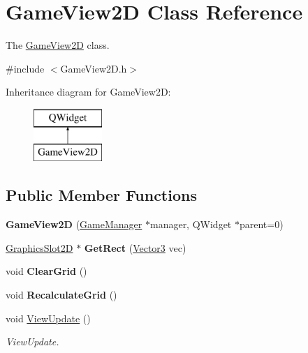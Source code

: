 \hypertarget{classGameView2D}{\section{Game\-View2\-D Class Reference}
\label{classGameView2D}
}


The \hyperlink{classGameView2D}{Game\-View2\-D} class.  




{\ttfamily \#include $<$Game\-View2\-D.\-h$>$}

Inheritance diagram for Game\-View2\-D\-:\begin{figure}[H]
\begin{center}
\leavevmode
\includegraphics[height=2.000000cm]{classGameView2D}
\end{center}
\end{figure}
\subsection*{Public Member Functions}
\begin{DoxyCompactItemize}
\item 
\hypertarget{classGameView2D_ade0d3e85d2385f952db7a5a72dcc34e3}{{\bfseries Game\-View2\-D} (\hyperlink{classGameManager}{Game\-Manager} $\ast$manager, Q\-Widget $\ast$parent=0)}\label{classGameView2D_ade0d3e85d2385f952db7a5a72dcc34e3}

\item 
\hypertarget{classGameView2D_a2599584223096c30f37ed12566ccea32}{\hyperlink{classGraphicsSlot2D}{Graphics\-Slot2\-D} $\ast$ {\bfseries Get\-Rect} (\hyperlink{structVector3}{Vector3} vec)}\label{classGameView2D_a2599584223096c30f37ed12566ccea32}

\item 
\hypertarget{classGameView2D_aa30c0b87cc0c44a68a9f30b5e9e22ea4}{void {\bfseries Clear\-Grid} ()}\label{classGameView2D_aa30c0b87cc0c44a68a9f30b5e9e22ea4}

\item 
\hypertarget{classGameView2D_aaf46ebd46da445c65fb1d54e805b7d9c}{void {\bfseries Recalculate\-Grid} ()}\label{classGameView2D_aaf46ebd46da445c65fb1d54e805b7d9c}

\item 
\hypertarget{classGameView2D_ad826ed1dccdcae1508693615e20df95e}{void \hyperlink{classGameView2D_ad826ed1dccdcae1508693615e20df95e}{View\-Update} ()}\label{classGameView2D_ad826ed1dccdcae1508693615e20df95e}

\begin{DoxyCompactList}\small\item\em View\-Update. \end{DoxyCompactList}\end{DoxyCompactItemize}


